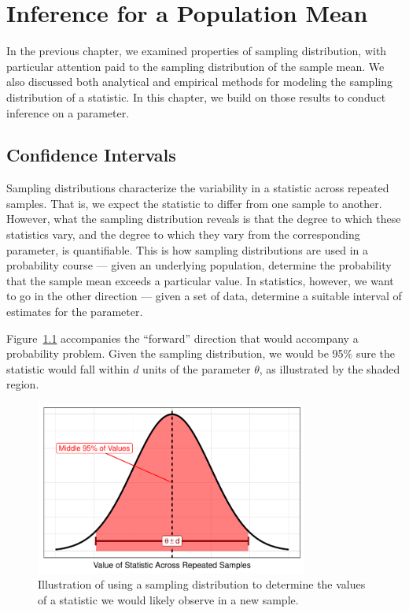 \documentclass[
  letterpaper,
  DIV=11,
  numbers=noendperiod]{scrreprt}
\theoremstyle{definition}
\theoremstyle{definition}
\theoremstyle{plain}
\theoremstyle{remark}
\begin{document}

\hypertarget{sec-inference}{%
\chapter{Inference for a Population Mean}\label{sec-inference}}

In the previous chapter, we examined properties of sampling
distribution, with particular attention paid to the sampling
distribution of the sample mean. We also discussed both analytical and
empirical methods for modeling the sampling distribution of a statistic.
In this chapter, we build on those results to conduct inference on a
parameter.

\hypertarget{confidence-intervals}{%
\section{Confidence Intervals}\label{confidence-intervals}}

Sampling distributions characterize the variability in a statistic
across repeated samples. That is, we expect the statistic to differ from
one sample to another. However, what the sampling distribution reveals
is that the degree to which these statistics vary, and the degree to
which they vary from the corresponding parameter, is quantifiable. This
is how sampling distributions are used in a probability course --- given
an underlying population, determine the probability that the sample mean
exceeds a particular value. In statistics, however, we want to go in the
other direction --- given a set of data, determine a suitable interval
of estimates for the parameter.

Figure~\ref{fig-inference-samplingdistribution} accompanies the
``forward'' direction that would accompany a probability problem. Given
the sampling distribution, we would be 95\% sure the statistic would
fall within \(d\) units of the parameter \(\theta\), as illustrated by
the shaded region.

\begin{figure}

{\centering \includegraphics[width=0.8\textwidth,height=\textheight]{./images/fig-inference-samplingdistribution-1.pdf}

}

\caption{\label{fig-inference-samplingdistribution}Illustration of using
a sampling distribution to determine the values of a statistic we would
likely observe in a new sample.}

\end{figure}
\end{document}
